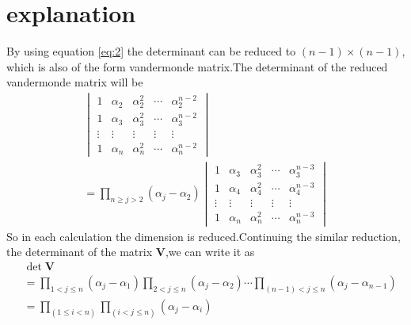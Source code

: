 \documentclass[journal,12pt,twocolumn]{IEEEtran}
\providecommand{\brak}[1]{\ensuremath{\left(#1\right)}}
\newcommand{\mydet}[1]{\ensuremath{\begin{vmatrix}#1\end{vmatrix}}}
\numberwithin{equation}{subsection}
\let\vec\mathbf
\begin{document}
\section{explanation}
By using equation \eqref{eq:2} the determinant can be reduced to $\brak{n-1}\times \brak{n-1}$, which is also of the form vandermonde matrix.The determinant of the reduced vandermonde matrix will be
\begin{align}
    {\mydet{1&\alpha_2&\alpha_2^2&\cdots&\alpha_2^{n-2}\\1&\alpha_3&\alpha_3^2&\cdots&\alpha_3^{n-2}\\\vdots&\vdots&\vdots&\vdots&\vdots\\1&\alpha_{n}&\alpha_{n}^2&\cdots&\alpha_{n}^{n-2}}}\\
    =\prod_{n\geq j >2} (\alpha_{j}-\alpha_{2}) {\mydet{1&\alpha_3&\alpha_3^2&\cdots&\alpha_3^{n-3}\\1&\alpha_4&\alpha_4^2&\cdots&\alpha_4^{n-3}\\\vdots&\vdots&\vdots&\vdots&\vdots\\1&\alpha_{n}&\alpha_{n}^2&\cdots&\alpha_{n}^{n-3}}}
\end{align}
So in each calculation the dimension is reduced.Continuing the similar reduction, the determinant of the matrix $\vec{V}$,we can write it as
\begin{align}
    &\det{\vec{V}}\\
    &=\prod_{1< j\leq n} (\alpha_{j}-\alpha_{1})\prod_{2< j\leq n}(\alpha_{j}-\alpha_{2})\cdots\prod_{(n-1)< j\leq n} (\alpha_{j}-\alpha_{n-1})\\
    &=\prod_{(1\leq i<n)}\prod_{(i< j\leq n)}(\alpha_{j}-\alpha_{i})
\end{align}
\end{document}
